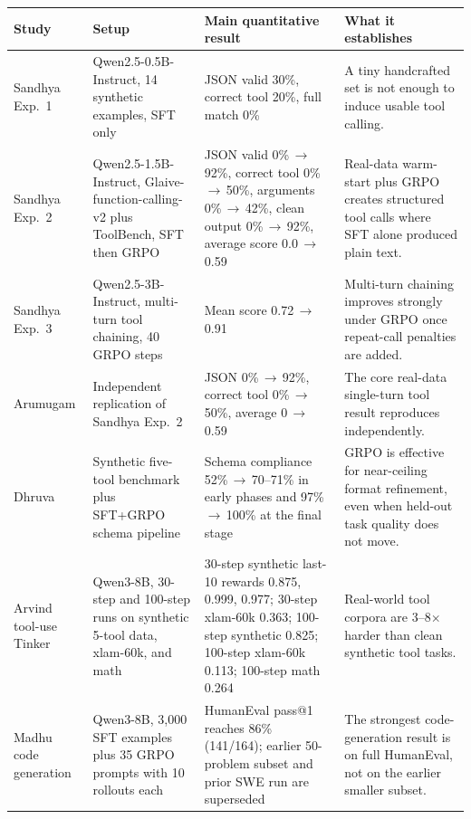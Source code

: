 \small
\begin{center}
\begin{tabularx}{\textwidth}{L{2.3cm}L{3.3cm}L{3.0cm}Y}
\toprule
Study & Setup & Main quantitative result & What it establishes \\
\midrule
Sandhya Exp.\ 1 & Qwen2.5-0.5B-Instruct, 14 synthetic examples, SFT only & JSON valid 30\%, correct tool 20\%, full match 0\% & A tiny handcrafted set is not enough to induce usable tool calling. \\
Sandhya Exp.\ 2 & Qwen2.5-1.5B-Instruct, Glaive-function-calling-v2 plus ToolBench, SFT then GRPO & JSON valid 0\%\,$\rightarrow$\,92\%, correct tool 0\%\,$\rightarrow$\,50\%, arguments 0\%\,$\rightarrow$\,42\%, clean output 0\%\,$\rightarrow$\,92\%, average score 0.0\,$\rightarrow$\,0.59 & Real-data warm-start plus GRPO creates structured tool calls where SFT alone produced plain text. \\
Sandhya Exp.\ 3 & Qwen2.5-3B-Instruct, multi-turn tool chaining, 40 GRPO steps & Mean score 0.72\,$\rightarrow$\,0.91 & Multi-turn chaining improves strongly under GRPO once repeat-call penalties are added. \\
Arumugam & Independent replication of Sandhya Exp.\ 2 & JSON 0\%\,$\rightarrow$\,92\%, correct tool 0\%\,$\rightarrow$\,50\%, average 0\,$\rightarrow$\,0.59 & The core real-data single-turn tool result reproduces independently. \\
Dhruva & Synthetic five-tool benchmark plus SFT+GRPO schema pipeline & Schema compliance 52\%\,$\rightarrow$\,70--71\% in early phases and 97\%\,$\rightarrow$\,100\% at the final stage & GRPO is effective for near-ceiling format refinement, even when held-out task quality does not move. \\
Arvind tool-use Tinker & Qwen3-8B, 30-step and 100-step runs on synthetic 5-tool data, xlam-60k, and math & 30-step synthetic last-10 rewards 0.875, 0.999, 0.977; 30-step xlam-60k 0.363; 100-step synthetic 0.825; 100-step xlam-60k 0.113; 100-step math 0.264 & Real-world tool corpora are 3--8$\times$ harder than clean synthetic tool tasks. \\
Madhu code generation & Qwen3-8B, 3,000 SFT examples plus 35 GRPO prompts with 10 rollouts each & HumanEval pass@1 reaches 86\% (141/164); earlier 50-problem subset and prior SWE run are superseded & The strongest code-generation result is on full HumanEval, not on the earlier smaller subset. \\
\bottomrule
\end{tabularx}
\end{center}
\normalsize

